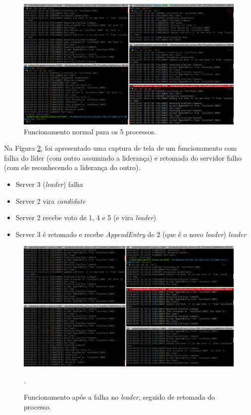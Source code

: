 \documentclass[journal,onecolumn]{IEEEtran}
\begin{document}
\begin{figure}[H]
\centering
\centerline{\includegraphics[scale=0.4]{imagens/funcionamento_normal.png}}
\caption{Funcionamento normal para os 5 processos.}
\label{funcionamento_normal}
\end{figure}

Na Figura \ref{falha_no_lider}, foi apresentado uma captura de tela de um funcionamento com falha do líder (com outro assumindo a liderança) e retomada do servidor falho (com ele reconhecendo a liderança do outro).

\begin{itemize}
\item Server 3 (\textit{leader}) falha
\item Server 2 vira \textit{candidate}
\item Server 2 recebe voto de 1, 4 e 5 (e vira \textit{leader})
\item Server 3 é retomado e recebe \textit{AppendEntry} de 2 (que é o novo \textit{leader}) \textit{leader}

\end{itemize}

\begin{figure}[H]
\centering
\centerline{\includegraphics[scale=0.4]{imagens/falha_no_lider.png}}
\caption{Funcionamento após a falha no \textit{leader}, seguido de retomada do processo.}.
\label{falha_no_lider}
\end{figure}
\end{document}
